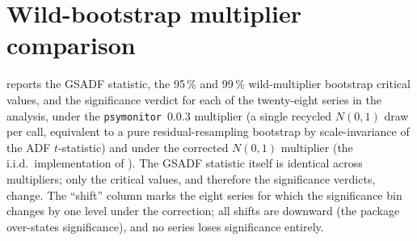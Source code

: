  
\section{Wild-bootstrap multiplier comparison}
\label{app:rob-multiplier}
 
 reports the GSADF statistic, the 95\,\% and 99\,\% wild-multiplier bootstrap critical values, and the significance verdict for each of the twenty-eight series in the analysis, under the \texttt{psymonitor}~0.0.3 multiplier (a single recycled $N(0,1)$ draw per call, equivalent to a pure residual-resampling bootstrap by scale-invariance of the ADF $t$-statistic) and under the corrected $N(0,1)$ multiplier (the i.i.d.~implementation of \citealt{harveyEtAl2016}). The GSADF statistic itself is identical across multipliers; only the critical values, and therefore the significance verdicts, change. The ``shift'' column marks the eight series for which the significance bin changes by one level under the correction; all shifts are downward (the package over-states significance), and no series loses significance entirely.
 
